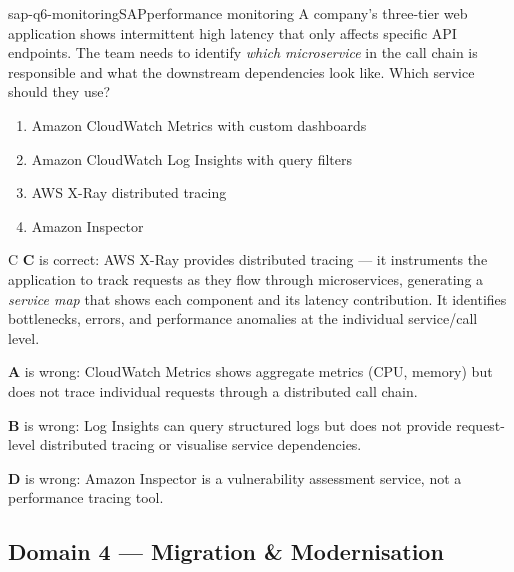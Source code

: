 \begin{question}{sap-q6-monitoring}{SAP}{performance monitoring}
A company's three-tier web application shows intermittent high latency that only affects specific API endpoints. The team needs to identify \emph{which microservice} in the call chain is responsible and what the downstream dependencies look like. Which service should they use?

\begin{enumerate}[label=\Alph*.]
  \item Amazon CloudWatch Metrics with custom dashboards
  \item Amazon CloudWatch Log Insights with query filters
  \item AWS X-Ray distributed tracing
  \item Amazon Inspector
\end{enumerate}
\end{question}

\begin{answer}{C}
\textbf{C} is correct: AWS X-Ray provides distributed tracing --- it instruments the application to track requests as they flow through microservices, generating a \emph{service map} that shows each component and its latency contribution. It identifies bottlenecks, errors, and performance anomalies at the individual service/call level.

\textbf{A} is wrong: CloudWatch Metrics shows aggregate metrics (CPU, memory) but does not trace individual requests through a distributed call chain.

\textbf{B} is wrong: Log Insights can query structured logs but does not provide request-level distributed tracing or visualise service dependencies.

\textbf{D} is wrong: Amazon Inspector is a vulnerability assessment service, not a performance tracing tool.
\end{answer}


\subsection{Domain 4 --- Migration \& Modernisation}

